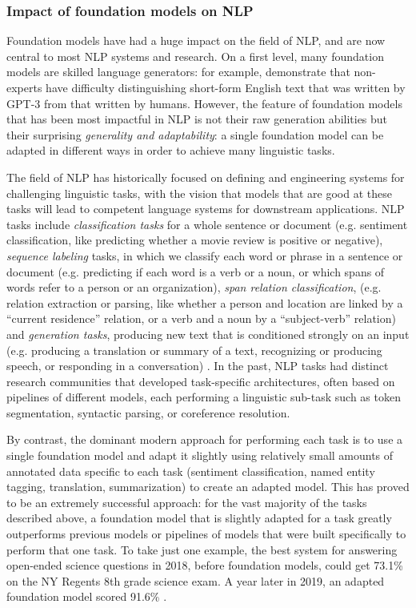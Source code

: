 \subsubsection{Impact of foundation models on NLP}

Foundation models have had a huge impact on the field of NLP, and are now central to most NLP systems and research. On a first level, many foundation models are skilled language generators: for example, \citet{clark2021all} demonstrate that non-experts have difficulty distinguishing short-form English text that was written by GPT-3 from that written by humans. However, the feature of foundation models that has been most impactful in NLP is not their raw generation abilities but their surprising \textit{generality and adaptability}: a single foundation model can be adapted in different ways in order to achieve many linguistic tasks.  

The field of NLP has historically focused on defining and engineering systems for challenging linguistic tasks, with the vision that models that are good at these tasks will lead to competent language systems for downstream applications.  NLP tasks include \textit{classification tasks} for a whole sentence or document (e.g. sentiment classification, like predicting  whether a movie review is positive or negative), \textit{sequence labeling} tasks, in which we classify each word or phrase in a sentence or document  (e.g. predicting if each word is a verb or a noun, or which spans of words refer to a person or an organization),  \textit{span relation classification}, (e.g. relation extraction or parsing, like whether  a person and location are linked by a ``current residence'' relation, or a verb and a noun by a ``subject-verb'' relation) and \textit{generation tasks}, producing new text that is conditioned strongly on an input (e.g. producing a translation or summary of a text, recognizing or producing speech, or responding in a conversation) \citep{jurafsky2009speech}. In the past, NLP tasks had distinct research communities that developed task-specific architectures, often based on pipelines of different models, each performing a linguistic sub-task such as token segmentation, syntactic parsing, or coreference resolution.

By contrast, the dominant modern approach for performing each task is to use a single foundation model and adapt it slightly using relatively small amounts of annotated data specific to each task (sentiment classification, named entity tagging, translation, summarization) to create an adapted model. This has proved to be an extremely successful approach: for the vast majority of the tasks described above, a foundation model that is slightly adapted for a task greatly outperforms previous models or pipelines of models that were built specifically to perform that one task. To take just one example, the best system for answering open-ended science questions in 2018, before foundation models, could get 73.1\% on the NY Regents 8th grade science exam. A year later in 2019, an adapted foundation model scored 91.6\% \citep{clark2019aristo}.

